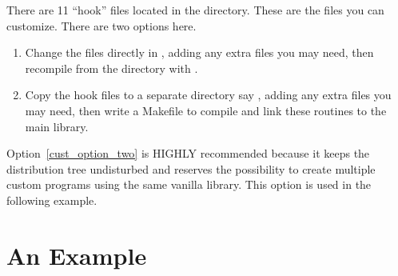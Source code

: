 There are 11 ``hook'' files located in the 
directory. These are the files you can customize. There are two
options here.
\begin{enumerate}
  \item Change the files directly in , adding any extra
    files you may need, then recompile from the  directory with
  .  \label{cust_option_one}
  \item Copy the hook files to a separate directory say ,
    adding any extra files you may need, then write a Makefile to 
    compile and link these
    routines to the main \tao library. \label{cust_option_two}
\end{enumerate}
Option~\ref{cust_option_two} is HIGHLY recommended because it keeps
the \tao distribution tree undisturbed and reserves the possibility to
create multiple custom \tao programs using the same vanilla \tao
library. This option is used in the following example.

\section{An Example}


